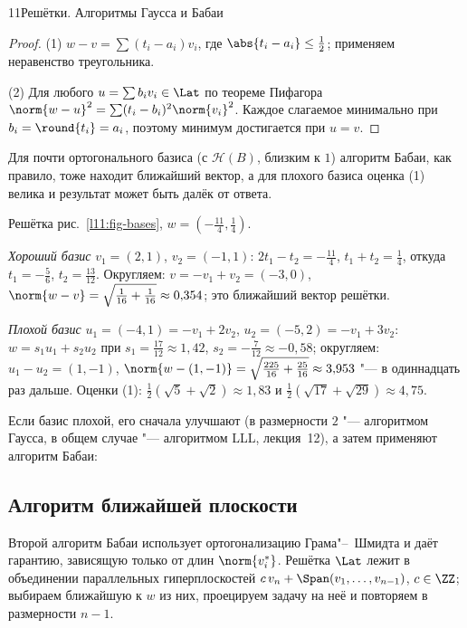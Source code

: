 \begin{lecture}{11}{Решётки. Алгоритмы Гаусса и Бабаи}
\begin{proof}
(1) $w - v = \sum (t_i - a_i) v_i$, где $\abs{t_i - a_i} \le \frac12$; применяем неравенство
треугольника.

(2) Для любого $u = \sum b_i v_i \in \Lat$ по теореме Пифагора
$\norm{w - u}^2 = \sum (t_i - b_i)^2\norm{v_i}^2$. Каждое слагаемое минимально при $b_i =
\round{t_i} = a_i$, поэтому минимум достигается при $u = v$.
\end{proof}

Для почти ортогонального базиса (с $\mathcal H(B)$, близким к $1$) алгоритм Бабаи, как правило,
тоже находит ближайший вектор, а для плохого базиса оценка (1) велика и результат может быть
далёк от ответа.

\begin{example}\label{l11:babai-hand}
Решётка рис.~\ref{l11:fig-bases}, $w = (-\frac{11}{4}, \frac14)$.

\emph{Хороший базис} $v_1 = (2, 1)$, $v_2 = (-1, 1)$: $2t_1 - t_2 = -\frac{11}4$,
$t_1 + t_2 = \frac14$, откуда $t_1 = -\frac56$, $t_2 = \frac{13}{12}$. Округляем:
$v = -v_1 + v_2 = (-3, 0)$, $\norm{w - v} = \sqrt{\frac1{16} + \frac1{16}} \approx 0{,}354$; это
ближайший вектор решётки.

\emph{Плохой базис} $u_1 = (-4, 1) = -v_1 + 2v_2$, $u_2 = (-5, 2) = -v_1 + 3v_2$:
$w = s_1 u_1 + s_2 u_2$ при $s_1 = \frac{17}{12} \approx 1{,}42$, $s_2 = -\frac{7}{12} \approx -0{,}58$;
округляем: $u_1 - u_2 = (1, -1)$, $\norm{w - (1, -1)} = \sqrt{\frac{225}{16} + \frac{25}{16}} \approx
3{,}953$ "--- в одиннадцать раз дальше. Оценки (1): $\frac12(\sqrt5 + \sqrt2) \approx 1{,}83$ и
$\frac12(\sqrt{17} + \sqrt{29}) \approx 4{,}75$.
\end{example}


Если базис плохой, его сначала улучшают (в размерности $2$ "--- алгоритмом Гаусса, в общем
случае "--- алгоритмом LLL, лекция~12), а затем применяют алгоритм Бабаи:



\subsection{Алгоритм ближайшей плоскости}

Второй алгоритм Бабаи использует ортогонализацию Грама"--~Шмидта и даёт гарантию, зависящую
только от длин $\norm{v_i^*}$. Решётка $\Lat$ лежит в объединении параллельных гиперплоскостей
$c\,v_n + \Span(v_1, \dots, v_{n-1})$, $c \in \ZZ$; выбираем ближайшую к $w$ из них, проецируем
задачу на неё и повторяем в размерности $n - 1$.


\end{lecture}

